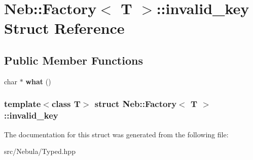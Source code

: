 \hypertarget{structNeb_1_1Factory_1_1invalid__key}{\section{\-Neb\-:\-:\-Factory$<$ \-T $>$\-:\-:invalid\-\_\-key \-Struct \-Reference}
\label{structNeb_1_1Factory_1_1invalid__key}
}
\subsection*{\-Public \-Member \-Functions}
\begin{DoxyCompactItemize}
\item 
\hypertarget{structNeb_1_1Factory_1_1invalid__key_ab9ef7384f621f8693b5185b4e846cbcd}{char $\ast$ {\bfseries what} ()}\label{structNeb_1_1Factory_1_1invalid__key_ab9ef7384f621f8693b5185b4e846cbcd}

\end{DoxyCompactItemize}
\subsubsection*{template$<$class T$>$ struct Neb\-::\-Factory$<$ T $>$\-::invalid\-\_\-key}



\-The documentation for this struct was generated from the following file\-:\begin{DoxyCompactItemize}
\item 
src/\-Nebula/\-Typed.\-hpp\end{DoxyCompactItemize}
